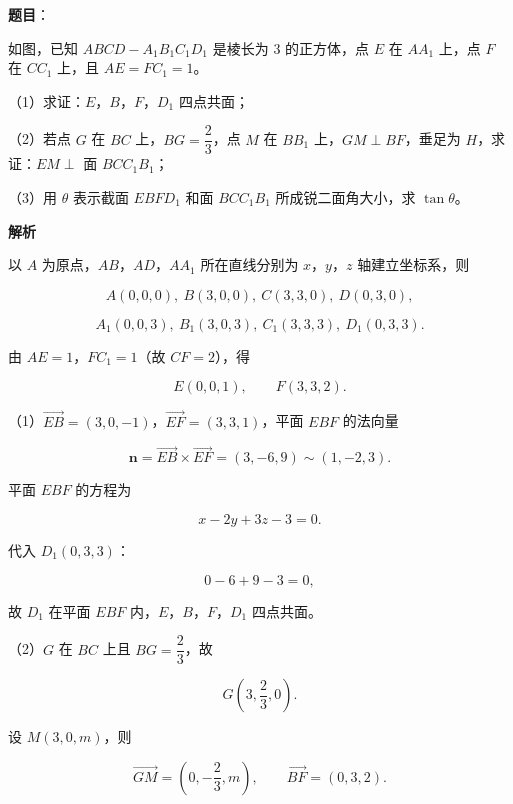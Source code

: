 \begin{answer}

\textbf{题目}：

如图，已知 $ABCD-A_1B_1C_1D_1$ 是棱长为 $3$ 的正方体，点 $E$ 在 $AA_1$ 上，点 $F$ 在 $CC_1$ 上，且 $AE=FC_1=1$。

（1）求证：$E$，$B$，$F$，$D_1$ 四点共面；

（2）若点 $G$ 在 $BC$ 上，$BG=\dfrac23$，点 $M$ 在 $BB_1$ 上，$GM\perp BF$，垂足为 $H$，求证：$EM\perp$ 面 $BCC_1B_1$；

（3）用 $\theta$ 表示截面 $EBFD_1$ 和面 $BCC_1B_1$ 所成锐二面角大小，求 $\tan\theta$。
\nopagebreak[4]
\begin{center}\end{center}
\nopagebreak[4]
\textbf{解析}

以 $A$ 为原点，$AB$，$AD$，$AA_1$ 所在直线分别为 $x$，$y$，$z$ 轴建立坐标系，则

\nopagebreak[4]
\[A(0,0,0),\ B(3,0,0),\ C(3,3,0),\ D(0,3,0),\]

\nopagebreak[4]
\[A_1(0,0,3),\ B_1(3,0,3),\ C_1(3,3,3),\ D_1(0,3,3).\]

由 $AE=1$，$FC_1=1$（故 $CF=2$），得

\nopagebreak[4]
\[E(0,0,1),\qquad F(3,3,2).\]

（1）$\overrightarrow{EB}=(3,0,-1)$，$\overrightarrow{EF}=(3,3,1)$，平面 $EBF$ 的法向量

\nopagebreak[4]
\[\boldsymbol n=\overrightarrow{EB}\times\overrightarrow{EF}=(3,-6,9)\sim(1,-2,3).\]

平面 $EBF$ 的方程为

\nopagebreak[4]
\[x-2y+3z-3=0.\]

代入 $D_1(0,3,3)$：

\nopagebreak[4]
\[0-6+9-3=0,\]

故 $D_1$ 在平面 $EBF$ 内，$E$，$B$，$F$，$D_1$ 四点共面。

（2）$G$ 在 $BC$ 上且 $BG=\dfrac23$，故

\nopagebreak[4]
\[G\left(3,\frac23,0\right).\]

设 $M(3,0,m)$，则

\nopagebreak[4]
\[\overrightarrow{GM}=\left(0,-\frac23,m\right),\qquad \overrightarrow{BF}=(0,3,2).\]


\end{answer}
